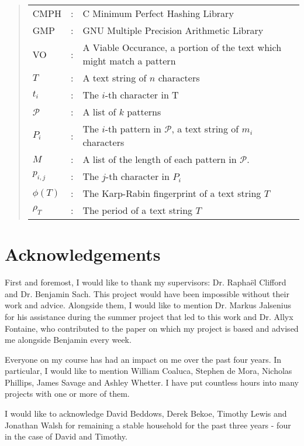\documentclass[ %
                    author={Dominic Joseph Moylett},
                supervisor={Dr. Raphael Clifford and Dr. Benjamin Sach},
                    degree={MEng},
                     title={Dictionary Matching with Fingerprints},
                  subtitle={An Empirical Analysis},
                      type={Research},
                      year={2014} ]{dissertation}
\begin{document}
\begin{quote}
\noindent
\begin{tabular}{lcl}
CMPH &: & C Minimum Perfect Hashing Library \\
GMP &: & GNU Multiple Precision Arithmetic Library \\
VO &: & A Viable Occurance, a portion of the text which might match a pattern \\
$T$ &: & A text string of $n$ characters \\
$t_i$ &: & The $i$-th character in T \\
$\mathcal{P}$ &: & A list of $k$ patterns \\
$P_i$ &: & The $i$-th pattern in $\mathcal{P}$, a text string of $m_i$ characters \\
$M$ &: & A list of the length of each pattern in $\mathcal{P}$. \\
$p_{i,j}$ &: & The $j$-th character in $P_i$ \\
$\phi(T)$ &: & The Karp-Rabin fingerprint of a text string $T$ \\
$\rho_T$ &: & The period of a text string $T$ \\
\end{tabular}
\end{quote}


\chapter*{Acknowledgements}

\noindent
First and foremost, I would like to thank my supervisors: Dr. Rapha\"{e}l Clifford and Dr. Benjamin Sach. This project would have been impossible without their work and advice. Alongside them, I would like to mention Dr. Markus Jalsenius for his assistance during the summer project that led to this work and Dr. Allyx Fontaine, who contributed to the paper on which my project is based and advised me alongside Benjamin every week.

Everyone on my course has had an impact on me over the past four years. In particular, I would like to mention William Coaluca, Stephen de Mora, Nicholas Phillips, James Savage and Ashley Whetter. I have put countless hours into many projects with one or more of them.

I would like to acknowledge David Beddows, Derek Bekoe, Timothy Lewis and Jonathan Walsh for remaining a stable household for the past three years - four in the case of David and Timothy.
\end{document}
